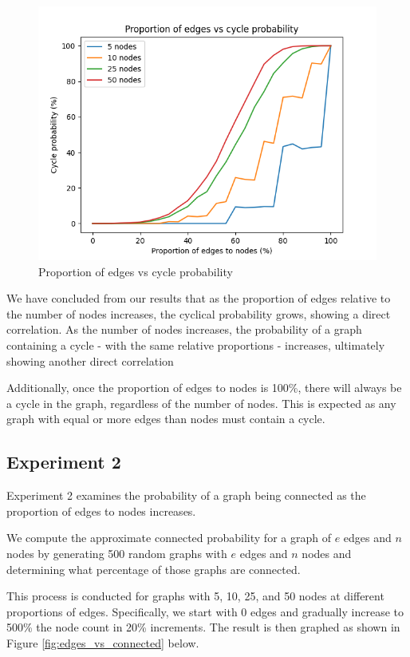 \documentclass[titlepage]{article}
\begin{document}
\begin{figure}[H]
    \centering
    \includegraphics[width=0.8\linewidth]{experiment_1.png}
    \caption{Proportion of edges vs cycle probability}
    \label{fig:edges_vs_cycle}
\end{figure}

We have concluded from our results that as the proportion of edges relative to the number of nodes increases, the cyclical probability grows, showing a direct correlation. As the number of nodes increases, the probability of a graph containing a cycle - with the same relative proportions - increases, ultimately showing another direct correlation

Additionally, once the proportion of edges to nodes is 100\%, there will always be a cycle in the graph, regardless of the number of nodes. This is expected as any graph with equal or more edges than nodes must contain a cycle.

\subsection{Experiment 2}

Experiment 2 examines the probability of a graph being connected as the proportion of edges to nodes increases.

We compute the approximate connected probability for a graph of $e$ edges and $n$ nodes by generating 500 random graphs with $e$ edges and $n$ nodes and determining what percentage of those graphs are connected.

This process is conducted for graphs with 5, 10, 25, and 50 nodes at different proportions of edges. Specifically, we start with 0 edges and gradually increase to 500\% the node count in 20\% increments. The result is then graphed as shown in Figure \ref{fig:edges_vs_connected} below.
\end{document}

